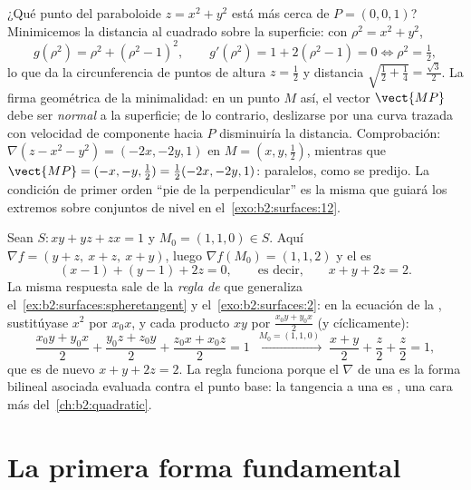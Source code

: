 \begin{example}\label{ex:b2:surfaces:closest}
¿Qué punto del paraboloide $z = x^2 + y^2$ está más cerca de $P =
(0, 0, 1)$? Minimicemos la distancia al cuadrado sobre la superficie:
con $\rho^2 = x^2 + y^2$,
\[
g(\rho^2) = \rho^2 + (\rho^2 - 1)^2,
\qquad
g'(\rho^2) = 1 + 2(\rho^2 - 1) = 0
\iff \rho^2 = \tfrac12 ,
\]
lo que da la circunferencia de puntos de altura $z = \frac12$ y
distancia $\sqrt{\tfrac12 + \tfrac14} = \frac{\sqrt3}2$. La firma
geométrica de la minimalidad: en un punto $M$ así, el vector
$\vect{MP}$ debe ser \emph{normal} a la superficie; de lo contrario,
deslizarse por una curva trazada con velocidad de componente hacia
$P$ disminuiría la distancia. Comprobación: $\nabla(z - x^2 - y^2) =
(-2x, -2y, 1)$ en $M = (x, y, \tfrac12)$, mientras que $\vect{MP} =
(-x, -y, \tfrac12) = \tfrac12(-2x, -2y, 1)$: paralelos, como se
predijo. La condición de primer orden ``pie de la perpendicular'' es
la misma que guiará los extremos sobre conjuntos de nivel en el~\cref{exo:b2:surfaces:12}.
\end{example}

\begin{example}\label{ex:b2:surfaces:polarization}
Sean $S : xy + yz + zx = 1$ y $M_0 = (1, 1, 0) \in S$. Aquí $\nabla f
= (y + z,\ x + z,\ x + y)$, luego $\nabla f(M_0) = (1, 1, 2)$ y el
 es
\[
(x - 1) + (y - 1) + 2z = 0,
\qquad\text{es decir,}\qquad x + y + 2z = 2 .
\]
La misma respuesta sale de la \emph{regla de } que
generaliza el~\cref{ex:b2:surfaces:spheretangent} y el~\cref{exo:b2:surfaces:2}: en la ecuación de la ,
sustitúyase $x^2$ por $x_0x$, y cada producto $xy$ por $\frac{x_0y +
y_0x}2$ (y cíclicamente):
\[
\frac{x_0y + y_0x}2 + \frac{y_0z + z_0y}2 + \frac{z_0x +
x_0z}2 = 1
\;\xrightarrow{\ M_0 = (1,1,0)\ }\;
\frac{x + y}2 + \frac z2 + \frac z2 = 1 ,
\]
que es de nuevo $x + y + 2z = 2$. La regla funciona porque el
$\nabla$ de una  es la forma bilineal asociada
evaluada contra el punto base: la tangencia a una  es
, una cara más del~\cref{ch:b2:quadratic}.
\end{example}

\section{La primera forma fundamental}

